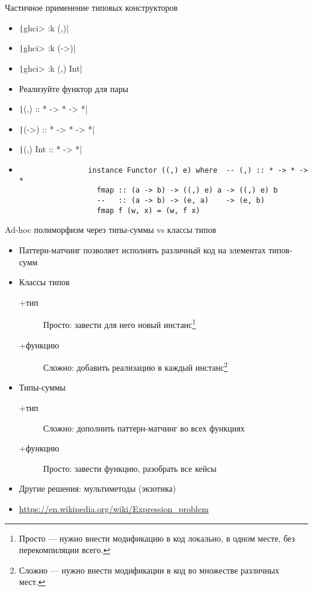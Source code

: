     \begin{frame}[fragile]{Частичное применение типовых конструкторов}
        \begin{itemize}
            \item[\todo] \texttt|ghci> :k (,)|
            \item[\todo] \texttt|ghci> :k (->)|
            \item[\todo] \texttt|ghci> :k (,) Int|
            \item[\todo] Реализуйте функтор для пары
            \item[\answer] \pause \texttt|(,) :: * -> * -> *|
            \item[\answer] \pause \texttt|(->) :: * -> * -> *|
            \item[\answer] \pause \texttt|(,) Int :: * -> *|
            \item[\answer] \pause
            \begin{verbatim}
                instance Functor ((,) e) where  -- (,) :: * -> * -> *
                  fmap :: (a -> b) -> ((,) e) a -> ((,) e) b
                  --   :: (a -> b) -> (e, a)    -> (e, b)
                  fmap f (w, x) = (w, f x)
            \end{verbatim}
        \end{itemize}
    \end{frame}


    \begin{frame}[fragile]{Ad-hoc полиморфизм через типы-суммы vs классы типов}
        \begin{itemize}
            \item Паттерн-матчинг позволяет исполнять различный код на элементах типов-сумм
            \item Классы типов
            \begin{description}
                \item[+тип] Просто: завести для него новый инстанс\footnote{Просто --- нужно внести модификацию в код локально, в одном месте, без перекомпиляции всего.}
                \item[+функцию] Сложно: добавить реализацию в каждый инстанс\footnote{Сложно --- нужно внести модификации в код во множестве различных мест.}
            \end{description}
            \item Типы-суммы
            \begin{description}
                \item[+тип] Сложно: дополнить паттерн-матчинг во всех функциях
                \item[+функцию] Просто: завести функцию, разобрать все кейсы
            \end{description}
            \item Другие решения: мультиметоды (экзотика)
            \item {\color{blue}\url{https://en.wikipedia.org/wiki/Expression\_problem}}
        \end{itemize}
    \end{frame}

